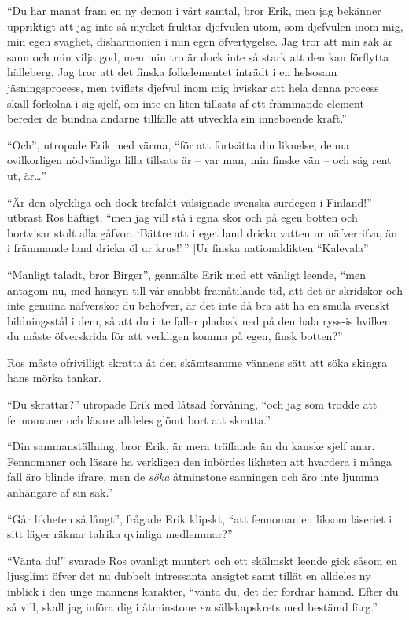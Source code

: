 ``Du har manat fram en ny demon i vårt samtal, bror Erik, men jag
bekänner uppriktigt att jag inte så mycket fruktar djefvulen utom, som
djefvulen inom mig, min egen svaghet, disharmonien i min egen
öfvertygelse. Jag tror att min sak är sann och min vilja god, men min
tro är dock inte så stark att den kan förflytta hälleberg. Jag tror att
det finska folkelementet inträdt i en helsosam jäsningsprocess, men
tviflets djefvul inom mig hviskar att hela denna process skall förkolna
i sig sjelf, om inte en liten tillsats af ett främmande element bereder
de bundna andarne tillfälle att utveckla sin inneboende kraft.''

``Och'', utropade Erik med värma, ``för att fortsätta din liknelse,
denna ovilkorligen nödvändiga lilla tillsats är -- var man, min finske
vän -- och säg rent ut, är\ldots{}''

``Är den olyckliga och dock trefaldt välsignade svenska surdegen i
Finland!'' utbrast Ros häftigt, ``men jag vill stå i egna skor och på
egen botten och bortvisar stolt alla gåfvor. `Bättre att i eget land
dricka vatten ur näfverrifva, än i främmande land dricka öl ur
krus!'\,'' {[}Ur finska nationaldikten ``Kalevala''{]}

``Manligt taladt, bror Birger'', genmälte Erik med ett vänligt leende,
``men antagom nu, med hänsyn till vår snabbt framåtilande tid, att det
är skridskor och inte genuina näfverskor du behöfver, är det inte då bra
att ha en smula svenskt bildningsstål i dem, så att du inte faller
pladask ned på den hala ryss-is hvilken du måste öfverskrida för att
verkligen komma på egen, finsk botten?''

Ros måste ofrivilligt skratta åt den skämtsamme vännens sätt att söka
skingra hans mörka tankar.

``Du skrattar?'' utropade Erik med låtsad förvåning, ``och jag som
trodde att fennomaner och läsare alldeles glömt bort att skratta.''

``Din sammanställning, bror Erik, är mera träffande än du kanske sjelf
anar. Fennomaner och läsare ha verkligen den inbördes likheten att
hvardera i många fall äro blinde ifrare, men de \emph{söka} åtminstone
sanningen och äro inte ljumma anhängare af sin sak.''

``Går likheten så långt'', frågade Erik klipskt, ``att fennomanien
liksom läseriet i sitt läger räknar talrika qvinliga medlemmar?''

``Vänta du!'' svarade Ros ovanligt muntert och ett skälmskt leende gick
såsom en ljusglimt öfver det nu dubbelt intressanta ansigtet samt tillät
en alldeles ny inblick i den unge mannens karakter, ``vänta du, det der
fordrar hämnd. Efter du så vill, skall jag införa dig i åtminstone
\emph{en} sällskapskrets med bestämd färg.''

